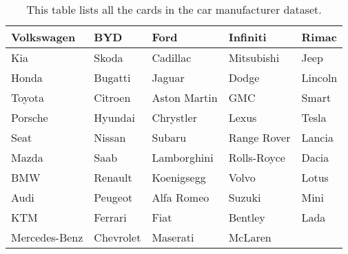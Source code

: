 \begin{table}[bp]
\centering
\begin{tabularx}
{\linewidth}{|X|X|X|X|X|}
\hline
Volkswagen    & BYD      & Ford         & Infiniti    & Rimac   \\
\hline
Kia           & Skoda    & Cadillac     & Mitsubishi  & Jeep    \\
\hline
Honda         & Bugatti  & Jaguar       & Dodge       & Lincoln \\
\hline
Toyota        & Citroen  & Aston Martin & GMC         & Smart   \\
\hline
Porsche       & Hyundai  & Chrystler    & Lexus       & Tesla   \\
\hline
Seat          & Nissan   & Subaru       & Range Rover & Lancia  \\
\hline
Mazda         & Saab     & Lamborghini  & Rolls-Royce & Dacia   \\
\hline
BMW           & Renault  & Koenigsegg   & Volvo       & Lotus   \\
\hline
Audi          & Peugeot  & Alfa Romeo   & Suzuki      & Mini    \\
\hline
KTM           & Ferrari  & Fiat         & Bentley     & Lada    \\
\hline
Mercedes-Benz & Chevrolet& Maserati     & McLaren     &        \\
\hline
\end{tabularx} 
\caption[Car Dataset] 
{ 
This table lists all the cards in the car manufacturer dataset.
}
\label{tab:dataset-car}
\end{table}

